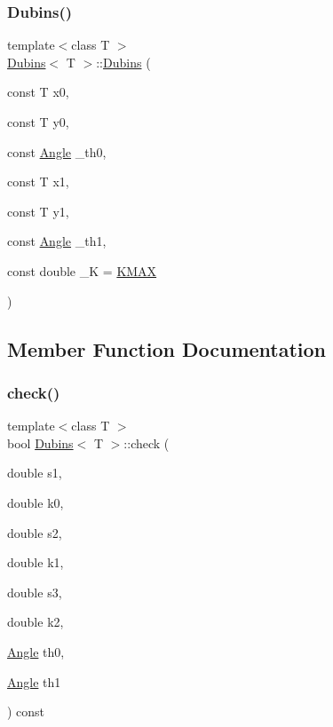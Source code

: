 \mbox{\label{class_dubins_a8f2efa271286dda2c669988b600ac858}} 
\subsubsection{\texorpdfstring{Dubins()}{Dubins()}\hspace{0.1cm}{\footnotesize\ttfamily [4/4]}}
{\footnotesize\ttfamily template$<$class T $>$ \\
\mbox{\hyperlink{class_dubins}{Dubins}}$<$ T $>$\+::\mbox{\hyperlink{class_dubins}{Dubins}} (\begin{DoxyParamCaption}\item[{const T}]{x0,  }\item[{const T}]{y0,  }\item[{const \mbox{\hyperlink{class_angle}{Angle}}}]{\+\_\+th0,  }\item[{const T}]{x1,  }\item[{const T}]{y1,  }\item[{const \mbox{\hyperlink{class_angle}{Angle}}}]{\+\_\+th1,  }\item[{const double}]{\+\_\+K = {\ttfamily \mbox{\hyperlink{dubins_8hh_a940b85a83458e94519f2685b33ddd276}{K\+M\+AX}}} }\end{DoxyParamCaption})\hspace{0.3cm}{\ttfamily [inline]}}



\subsection{Member Function Documentation}
\mbox{\label{class_dubins_ae016db7e7b4c450c0281792608205449}} 
\subsubsection{\texorpdfstring{check()}{check()}}
{\footnotesize\ttfamily template$<$class T $>$ \\
bool \mbox{\hyperlink{class_dubins}{Dubins}}$<$ T $>$\+::check (\begin{DoxyParamCaption}\item[{double}]{s1,  }\item[{double}]{k0,  }\item[{double}]{s2,  }\item[{double}]{k1,  }\item[{double}]{s3,  }\item[{double}]{k2,  }\item[{\mbox{\hyperlink{class_angle}{Angle}}}]{th0,  }\item[{\mbox{\hyperlink{class_angle}{Angle}}}]{th1 }\end{DoxyParamCaption}) const\hspace{0.3cm}{\ttfamily [inline]}}

